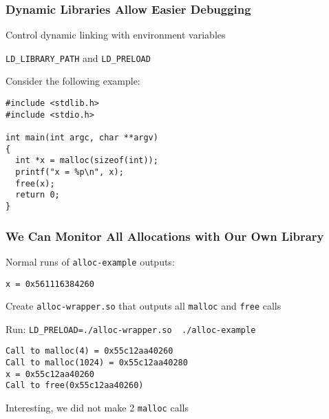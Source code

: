   \begin{frame}[fragile]
    \frametitle{Dynamic Libraries Allow Easier Debugging}

    Control dynamic linking with environment variables

    \hspace{2em} \texttt{LD\_LIBRARY\_PATH} and \texttt{LD\_PRELOAD}

    \vspace{2em}

    Consider the following example:
    \begin{lstlisting}[xleftmargin=2em]
#include <stdlib.h>
#include <stdio.h>

int main(int argc, char **argv)
{
  int *x = malloc(sizeof(int));
  printf("x = %p\n", x);
  free(x);
  return 0;
}
    \end{lstlisting}
  \end{frame}

  \begin{frame}[fragile]
    \frametitle{We Can Monitor All Allocations with Our Own Library}

    Normal runs of \texttt{alloc-example} outputs:
    \begin{lstlisting}
x = 0x561116384260
    \end{lstlisting}

    \vspace{1em}

    Create \texttt{alloc-wrapper.so} that outputs all \texttt{malloc} and
    \texttt{free} calls

    \vspace{1em}

    Run: \lstinline|LD_PRELOAD=./alloc-wrapper.so  ./alloc-example|

    \begin{lstlisting}[xleftmargin=2em]
Call to malloc(4) = 0x55c12aa40260                  
Call to malloc(1024) = 0x55c12aa40280
x = 0x55c12aa40260
Call to free(0x55c12aa40260)
    \end{lstlisting}

    \vspace{1em}

    Interesting, we did not make 2 \texttt{malloc} calls
  \end{frame}

